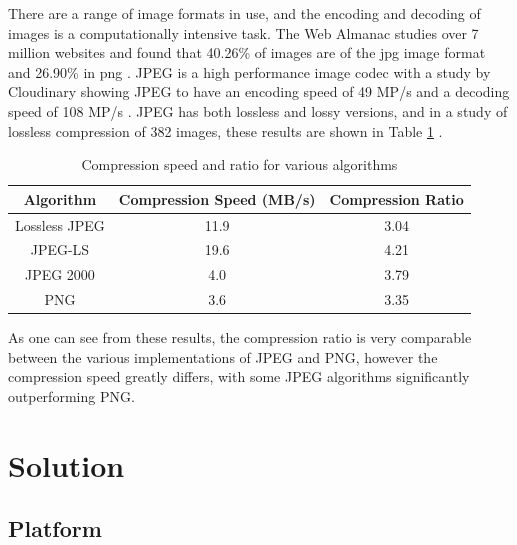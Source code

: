 \documentclass[12pt,a4paper]{article}
\begin{document}
There are a range of image formats in use, and the encoding and decoding of images is a computationally intensive task. The Web Almanac studies over 7 million websites and found that 40.26\% of images are of the jpg image format and 26.90\% in png \cite{webalmanac}. JPEG is a high performance image codec with a study by Cloudinary showing JPEG to have an encoding speed of 49 MP/s and a decoding speed of 108 MP/s \cite{cloudinary}. JPEG has both lossless and lossy versions, and in a study of lossless compression of 382 images, these results are shown in Table \ref{speedratio} \cite{ukrit2011survey}.


\begin{table}[H]
    \centering
    \caption{Compression speed and ratio for various algorithms}
    \vspace*{6pt}
    \label{speedratio}
    \begin{tabular}{ccc}\hline\hline
        Algorithm     & Compression Speed (MB/s) & Compression Ratio \\ \hline
        Lossless JPEG & 11.9                     & 3.04              \\
        JPEG-LS       & 19.6                     & 4.21              \\
        JPEG 2000     & 4.0                      & 3.79              \\
        PNG           & 3.6                      & 3.35              \\
    \end{tabular}
\end{table}

As one can see from these results, the compression ratio is very comparable between the various implementations of JPEG and PNG, however the compression speed greatly differs, with some JPEG algorithms significantly outperforming PNG.


\section{Solution}

\subsection{Platform}
\end{document}
